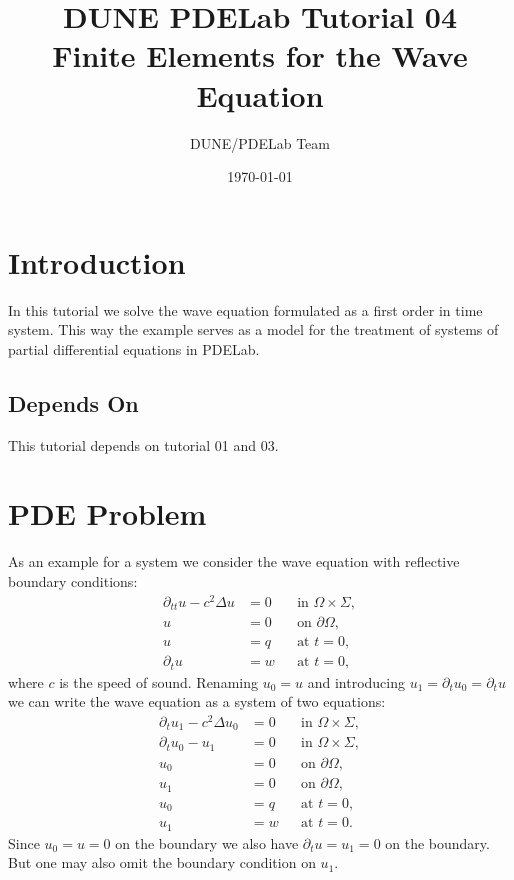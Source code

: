 \documentclass[a4paper,12pt]{article}
\title{DUNE PDELab Tutorial 04 \\
Finite Elements for the Wave Equation}
\author{DUNE/PDELab Team}
\date{\today}
\begin{document}
\maketitle
\tableofcontents
\clearpage

\section{Introduction}

In this tutorial we solve the wave equation formulated as a first order
in time system. This way the example serves as a model for the
treatment of systems of partial differential equations in PDELab.

\subsection*{Depends On} This tutorial depends on tutorial 01 and 03.

\section{PDE Problem}

As an example for a system we consider the wave equation with reflective boundary conditions:
\begin{subequations}
\label{eq:WaveEquation}
\begin{align}
\partial_{tt} u-c^2\Delta u  &= 0 &&\text{in $\Omega\times\Sigma$},\\
u &= 0 &&\text{on $\partial\Omega$},\\
u &= q &&\text{at $t=0$},\\
\partial_t u &= w &&\text{at $t=0$},
\end{align}
\end{subequations}
where $c$ is the speed of sound.
Renaming $u_0=u$ and introducing $u_1=\partial_t u_0 =\partial_t u$ we can write the wave equation as a system of two equations:
\begin{subequations}
\label{eq:SystemForm1}
\begin{align}
\partial_t u_1 - c^2\Delta u_0 &=0 &&\text{in $\Omega\times\Sigma$}, \label{eq:2a}\\
\partial_t u_0 - u_1 &=0 &&\text{in $\Omega\times\Sigma$}, \label{eq:2b}\\
u_0 &= 0 &&\text{on $\partial\Omega$},\\
u_1 &= 0 &&\text{on $\partial\Omega$},\\
u_0 &= q &&\text{at $t=0$},\\
u_1 &= w &&\text{at $t=0$}.
\end{align}
\end{subequations}
Since $u_0=u=0$ on the boundary we also have $\partial_t u = u_1 = 0$ on the boundary.
But one may also omit the boundary condition on $u_1$.
\end{document}
